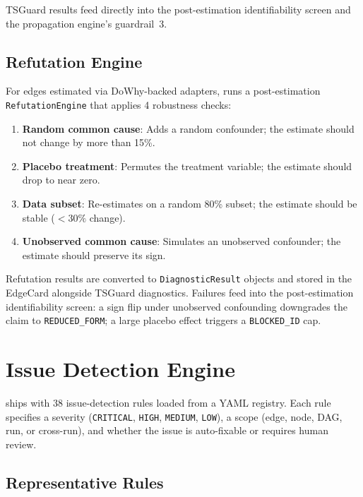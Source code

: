 \documentclass{article}
\begin{document}
TSGuard results feed directly into the post-estimation identifiability screen and the propagation engine's guardrail~3.

\subsection{Refutation Engine}
\label{sec:refutation}

For edges estimated via DoWhy-backed adapters, \oc{} runs a post-estimation \texttt{RefutationEngine} that applies 4 robustness checks:

\begin{enumerate}[leftmargin=*, itemsep=1pt]
    \item \textbf{Random common cause}: Adds a random confounder; the estimate should not change by more than 15\%.
    \item \textbf{Placebo treatment}: Permutes the treatment variable; the estimate should drop to near zero.
    \item \textbf{Data subset}: Re-estimates on a random 80\% subset; the estimate should be stable (${<}30\%$ change).
    \item \textbf{Unobserved common cause}: Simulates an unobserved confounder; the estimate should preserve its sign.
\end{enumerate}

Refutation results are converted to \texttt{DiagnosticResult} objects and stored in the EdgeCard alongside TSGuard diagnostics. Failures feed into the post-estimation identifiability screen: a sign flip under unobserved confounding downgrades the claim to \texttt{REDUCED\_FORM}; a large placebo effect triggers a \texttt{BLOCKED\_ID} cap.

\section{Issue Detection Engine}
\label{sec:issues}

\oc{} ships with 38 issue-detection rules loaded from a YAML registry. Each rule specifies a severity (\texttt{CRITICAL}, \texttt{HIGH}, \texttt{MEDIUM}, \texttt{LOW}), a scope (edge, node, DAG, run, or cross-run), and whether the issue is auto-fixable or requires human review.

\subsection{Representative Rules}
\end{document}
